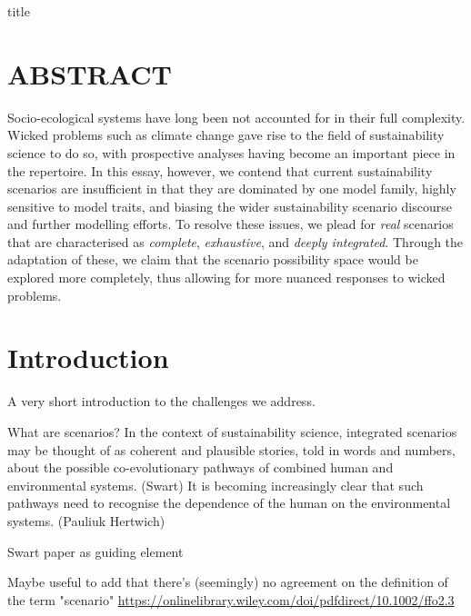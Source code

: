 \documentclass{article}
\begin{document}
{title}

\frontmatter
\tableofcontents

\mainmatter
\linenumbers

{\huge{\multiTitle}}

\section*{ABSTRACT}
Socio-ecological systems have long been not accounted for in their full complexity. Wicked problems such as climate change gave rise to the field of sustainability science to do so, with prospective analyses having become an important piece in the repertoire. In this essay, however, we contend that current sustainability scenarios are insufficient in that they are dominated by one model family, highly sensitive to model traits, and biasing the wider sustainability scenario discourse and further modelling efforts. To resolve these issues, we plead for \textit{real} scenarios that are characterised as \textit{complete}, \textit{exhaustive}, and \textit{deeply integrated}. Through the adaptation of these, we claim that the scenario possibility space would be explored more completely, thus allowing for more nuanced responses to wicked problems.




\label{intro}

\section{Introduction}
A very short introduction to the challenges we address.

What are scenarios? In the context of sustainability
science, integrated scenarios may be thought of as
coherent and plausible stories, told in words and
numbers, about the possible co-evolutionary pathways
of combined human and environmental systems. (Swart)
It is becoming increasingly clear that such pathways need to recognise the dependence of the human on the environmental systems. (Pauliuk Hertwich)

Swart paper as guiding element

Maybe useful to add that there's (seemingly) no agreement on the definition of the term "scenario" \url{https://onlinelibrary.wiley.com/doi/pdfdirect/10.1002/ffo2.3}
\end{document}
